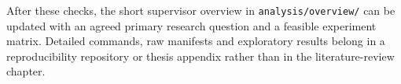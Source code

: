 After these checks, the short supervisor overview in
\texttt{analysis/overview/} can be updated with an agreed primary
research question and a feasible experiment matrix.  Detailed commands,
raw manifests and exploratory results belong in a reproducibility
repository or thesis appendix rather than in the literature-review
chapter.
